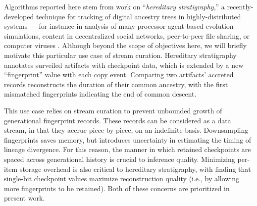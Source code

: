 
Algorithms reported here stem from work on ``\textit{hereditary stratigraphy},'' a recently-developed technique for tracking of digital ancestry trees in highly-distributed systems --- for instance in analysis of many-processor agent-based evolution simulations, content in decentralized social networks, peer-to-peer file sharing, or computer viruses \citep{moreno2022hereditary}.
Although beyond the scope of objectives here, we will briefly motivate this particular use case of stream curation.
Hereditary stratigraphy annotates surveiled artifacts with checkpoint data, which is extended by a new ``fingerprint'' value with each copy event.
Comparing two artifacts' accreted records reconstructs the duration of their common ancestry, with the first mismatched fingerprints indicating the end of common descent.

This use case relies on stream curation to prevent unbounded growth of generational fingerprint records.
These records can be considered as a data stream, in that they accrue piece-by-piece, on an indefinite basis.
Downsampling fingerprints saves memory, but introduces uncertainty in estimating the timing of lineage divergence.
For this reason, the manner in which retained checkpoints are spaced across generational history is crucial to inference quality.
Minimizing per-item storage overhead is also critical to hereditary stratigraphy, with \citet{moreno2024guide} finding that single-bit checkpoint values maximize reconstruction quality (i.e., by allowing more fingerprints to be retained).
Both of these concerns are prioritized in present work.
